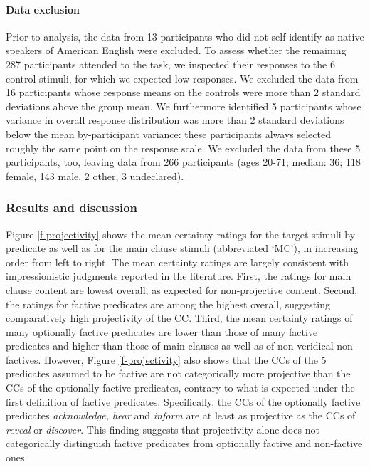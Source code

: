 \documentclass[11pt,fleqn]{article}
\newcommand{\6}{\mbox{$[\hspace*{-.6mm}[$}}
\newcommand{\9}{\mbox{$]\hspace*{-.6mm}]$}}
\begin{document}
\paragraph{Data exclusion}
Prior to analysis, the data from 13 participants who did not self-identify as native speakers of American English were excluded. To assess whether the remaining 287 participants attended to the task, we inspected their responses to the 6 control stimuli, for which we expected low responses. We excluded the data from 16 participants whose response means on the controls were more than 2 standard deviations above the group mean. We furthermore identified 5 participants whose variance in overall response distribution was more than 2 standard deviations below the mean by-participant variance: these participants always selected roughly the same point on the response scale. We excluded the data from these 5 participants, too, leaving data from 266 participants (ages 20-71; median: 36; 118 female, 143 male, 2 other, 3 undeclared).

\subsubsection{Results and discussion}\label{s22}

Figure \ref{f-projectivity} shows the mean certainty ratings for the target stimuli by predicate as well as for the main clause stimuli (abbreviated `MC'), in increasing order from left to right. The mean certainty ratings are largely consistent with impressionistic judgments reported in the literature. First, the ratings for main clause content are lowest overall, as expected for non-projective content. Second, the ratings for factive predicates are among the highest overall, suggesting comparatively high projectivity of the CC. Third, the mean certainty ratings of many optionally factive predicates are lower than those of many factive predicates and higher than those of main clauses as well as of non-veridical non-factives. However, Figure \ref{f-projectivity} also shows that the CCs of the 5 predicates assumed to be factive are not categorically more projective than the CCs of the optionally factive predicates, contrary to what is expected under the first definition of factive predicates. Specifically, the CCs of the optionally factive predicates {\em acknowledge, hear} and {\em inform} are at least as projective as the CCs of {\em reveal} or {\em discover}. This finding suggests that projectivity alone does not categorically distinguish factive predicates from optionally factive and non-factive ones.
\end{document}
